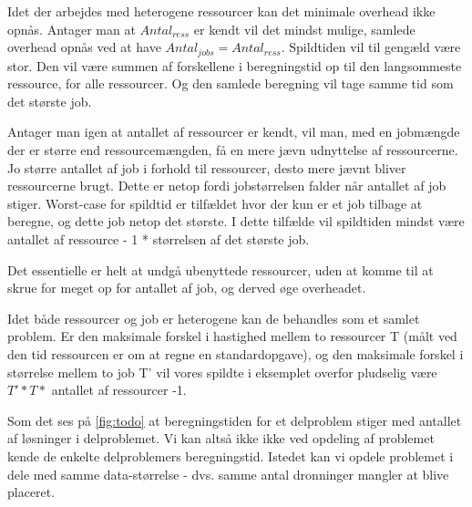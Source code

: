 \documentclass[pdf,draft,a4paper,11pt]{article}
\begin{document}
Idet der arbejdes med heterogene ressourcer kan det minimale overhead ikke opnås. Antager man at $Antal_{ress}$ er kendt vil det mindst mulige, samlede overhead opnås ved at have $Antal_{jobs} = Antal_{ress}$. Spildtiden vil til gengæld være stor. Den vil være summen af forskellene i beregningstid op til den langsommeste ressource, for alle ressourcer. Og den samlede beregning vil tage samme tid som det største job.

Antager man igen at antallet af ressourcer er kendt, vil man, med en jobmængde der er større end ressourcemængden, få en mere jævn udnyttelse af ressourcerne. Jo større antallet af job i forhold til ressourcer, desto mere jævnt bliver ressourcerne brugt. Dette er netop fordi jobstørrelsen falder når antallet af job stiger. Worst-case for spildtid er tilfældet hvor der kun er et job tilbage at beregne, og dette job netop det største. I dette tilfælde vil spildtiden mindst være antallet af ressource - 1 * størrelsen af det største job.

Det essentielle er helt at undgå ubenyttede ressourcer, uden at komme til at skrue for meget op for antallet af job, og derved øge overheadet.

Idet både ressourcer og job er heterogene kan de behandles som et samlet problem. Er den maksimale forskel i hastighed mellem to ressourcer T (målt ved den tid ressourcen er om at regne en standardopgave), og den maksimale forskel i størrelse mellem to job T' vil vores spildte i eksemplet overfor pludselig være $T'*T *$ antallet af ressourcer -1.




Som det ses på \ref{fig:todo} at beregningstiden for et delproblem stiger med antallet af løsninger i delproblemet. Vi kan altså ikke ikke ved opdeling af problemet kende de enkelte delproblemers beregningstid. Istedet kan vi opdele problemet i dele med samme data-størrelse - dvs. samme antal dronninger mangler at blive placeret. 
\end{document}

